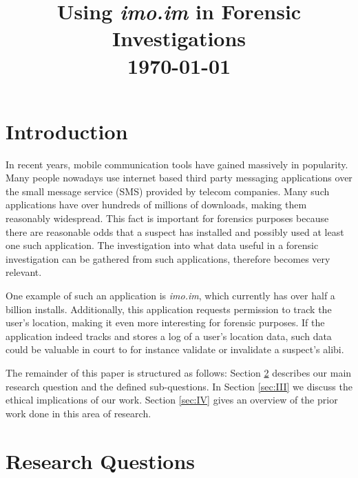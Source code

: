 \documentclass[conference]{IEEEtran}
\begin{document}
\title{Using {\it imo.im} in Forensic Investigations \\\vspace{5mm} \large  \today}
\author{
\and
{}
}
\maketitle
\thispagestyle{plain}
\pagestyle{plain}


\section{Introduction}

In recent years, mobile communication tools have gained massively in popularity.
Many people nowadays use internet based third party messaging applications over
the small message service (SMS) provided by telecom companies.  Many such
applications have over hundreds of millions of downloads, making them reasonably
widespread. This fact is important for forensics purposes because there are
reasonable odds that a suspect has installed and possibly used at least one such
application. The investigation into what data useful in a forensic investigation
can be gathered from such applications, therefore becomes very relevant.

One example of such an application is {\it imo.im}, which currently  has over
half a billion installs. Additionally, this application requests permission to
track the user's location, making it even more interesting for forensic
purposes. If the application indeed tracks and stores a log of a user's location
data, such data could be valuable in court to for instance validate or
invalidate a suspect's alibi.

The remainder of this paper is structured as follows: Section \ref{sec:II}
describes our main research question and the defined sub-questions. In Section
\ref{sec:III} we discuss the ethical implications of our work. Section
\ref{sec:IV} gives an overview of the prior work done in this area of research.

\section{Research Questions}\label{sec:II}
\end{document}
